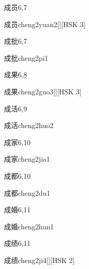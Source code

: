 \begin{entry}{成员}{6,7}
  \begin{phonetics}{成员}{cheng2yuan2}[][HSK 3]
  \end{phonetics}
\end{entry}

\begin{entry}{成批}{6,7}
  \begin{phonetics}{成批}{cheng2pi1}
  \end{phonetics}
\end{entry}

\begin{entry}{成果}{6,8}
  \begin{phonetics}{成果}{cheng2guo3}[][HSK 3]
  \end{phonetics}
\end{entry}

\begin{entry}{成活}{6,9}
  \begin{phonetics}{成活}{cheng2huo2}
  \end{phonetics}
\end{entry}

\begin{entry}{成家}{6,10}
  \begin{phonetics}{成家}{cheng2jia1}
  \end{phonetics}
\end{entry}

\begin{entry}{成都}{6,10}
  \begin{phonetics}{成都}{cheng2du1}
  \end{phonetics}
\end{entry}

\begin{entry}{成婚}{6,11}
  \begin{phonetics}{成婚}{cheng2hun1}
  \end{phonetics}
\end{entry}

\begin{entry}{成绩}{6,11}
  \begin{phonetics}{成绩}{cheng2ji4}[][HSK 2]
  \end{phonetics}
\end{entry}

